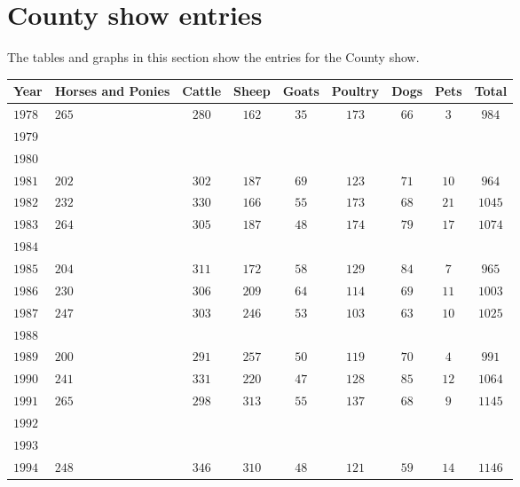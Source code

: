 \section*{County show entries}
The tables and graphs in this section show the entries for the County show.

\begin{longtable}{|l|p{1.1cm}ccccccc|}
\hline
    \textbf{Year} &
    \textbf{Horses and Ponies} &
    \textbf{Cattle} &
    \textbf{Sheep} &
    \textbf{Goats} &
    \textbf{Poultry} &
    \textbf{Dogs} &
    \textbf{Pets} &
    \textbf{Total}    
    \\
\hline
\endhead
\hline
\endfoot
    $1978$  & $265$ & $280$ & $162$ & $35$  & $173$ & $66$  & $3$   & $984$ \\
    $1979$  &       &       &       &       &       &       &       &       \\
    $1980$  &       &       &       &       &       &       &       &       \\
    $1981$  & $202$ & $302$ & $187$ & $69$  & $123$ & $71$  & $10$  & $964$ \\
    $1982$  & $232$ & $330$ & $166$ & $55$  & $173$ & $68$  & $21$  & $1045$\\
    $1983$  & $264$ & $305$ & $187$ & $48$  & $174$ & $79$  & $17$  & $1074$\\
    $1984$  &       &       &       &       &       &       &       &       \\
    $1985$  & $204$ & $311$ & $172$ & $58$  & $129$ & $84$  & $7$   & $965$ \\
    $1986$  & $230$ & $306$ & $209$ & $64$  & $114$ & $69$  & $11$  & $1003$ \\
    $1987$  & $247$ & $303$ & $246$ & $53$  & $103$ & $63$  & $10$  & $1025$ \\
    $1988$  &       &       &       &       &       &       &       &       \\
    $1989$  & $200$ & $291$ & $257$ & $50$  & $119$ & $70$  & $4$   & $991$ \\
    $1990$  & $241$ & $331$ & $220$ & $47$  & $128$ & $85$  & $12$  & $1064$ \\
    $1991$  & $265$ & $298$ & $313$ & $55$  & $137$ & $68$  & $9$   & $1145$ \\
    $1992$  &       &       &       &       &       &       &       &       \\
    $1993$  &       &       &       &       &       &       &       &       \\
    $1994$  & $248$ & $346$ & $310$ & $48$  & $121$ & $59$  & $14$  & $1146$ \\

\end{longtable}
